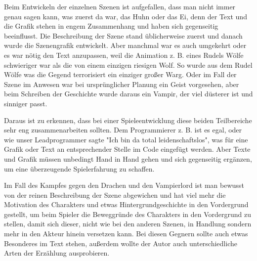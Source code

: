 Beim Entwickeln der einzelnen Szenen ist aufgefallen, dass man nicht immer genau sagen kann, was zuerst da war, das Huhn oder das Ei, denn der Text und die Grafik stehen in engem Zusammenhang und haben sich gegenseitig beeinflusst. Die Beschreibung der Szene stand üblicherweise zuerst und danach wurde die Szenengrafik entwickelt. Aber manchmal war es auch umgekehrt oder es war nötig den Text anzupassen, weil die Animation z. B. eines Rudels Wölfe schwieriger war als die von einem einzigen riesigen Wolf. So wurde aus dem Rudel Wölfe was die Gegend terrorisiert ein einziger großer Warg. Oder im Fall der Szene im Anwesen war bei ursprünglicher Planung ein Geist vorgesehen, aber beim Schreiben der Geschichte wurde daraus ein Vampir, der viel düsterer ist und sinniger passt.

Daraus ist zu erkennen, dass bei einer Spieleentwicklung diese beiden Teilbereiche sehr eng zusammenarbeiten sollten. Dem Programmierer z. B. ist es egal, oder wie unser Leadprogrammer sagte "Ich bin da total leidenschaftslos", was für eine Grafik oder Text an entsprechender Stelle im Code eingefügt werden. Aber Texte und Grafik müssen unbedingt Hand in Hand gehen und sich gegenseitig ergänzen, um eine überzeugende Spielerfahrung zu schaffen. 

Im Fall des Kampfes gegen den Drachen und den Vampierlord ist man bewusst von der reinen Beschreibung der Szene abgewichen und hat viel mehr die Motivation des Charakters und etwas Hintergrundgeschichte in den Vordergrund gestellt, um beim Spieler die Beweggründe des Charakters in den Vordergrund zu stellen, damit sich dieser, nicht wie bei den anderen Szenen, in Handlung sondern mehr in den Akteur hinein versetzen kann. Bei diesen Gegnern sollte auch etwas Besonderes im Text stehen, außerdem wollte der Autor auch unterschiedliche Arten der Erzählung ausprobieren.
